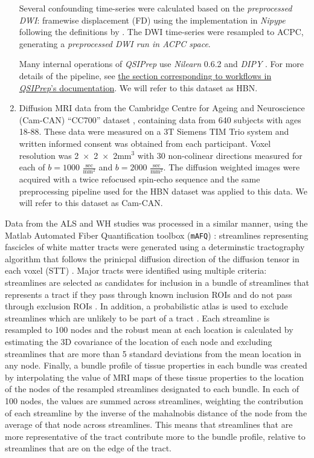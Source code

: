 \documentclass[10pt,%
               aps,%
               prl,%
               reprint,%
               superscriptaddress,%
               preprintnumbers,%
               linenumbers,%
               amsmath,%
               floatfix]{revtex4-2}
\begin{document}
\begin{enumerate}
Several confounding time-series were calculated based on the
\emph{preprocessed DWI}: framewise displacement (FD) using the implementation
in \emph{Nipype} following the definitions by \cite{power_fd_dvars}. The DWI
time-series were resampled to ACPC, generating a \emph{preprocessed DWI run
in ACPC space}.

Many internal operations of \emph{QSIPrep} use \emph{Nilearn} 0.6.2
\cite[RRID:SCR\_001362]{nilearn} and \emph{DIPY} \cite{dipy}. For more
details of the pipeline, see
\href{https://qsiprep.readthedocs.io/en/latest/workflows.html}{the
section corresponding to workflows in \emph{QSIPrep}'s documentation}.
We will refer to this dataset as HBN.

\item Diffusion MRI data from the Cambridge Centre for Ageing and
Neuroscience (Cam-CAN) ``CC700'' dataset
\cite{shafto2014cambridge,taylor2017cambridge}, containing data from 640
subjects with ages 18-88. These data were measured on a 3T Siemens TIM Trio
system and written informed consent was obtained from each participant. Voxel
resolution was \num{2x2x2}$\text{mm}^3$ with 30 non-colinear directions
measured for each of $b=1000$ $\frac{\text{sec}}{\text{mm}^2}$ and $b=2000$
$\frac{\text{sec}}{\text{mm}^2}$. The diffusion weighted images were acquired
with a twice refocused spin-echo sequence and the same preprocessing pipeline
used for the HBN dataset was applied to this data. We will refer to this
dataset as Cam-CAN.

\end{enumerate}

Data from the ALS and WH studies was processed in a similar manner,
using the Matlab Automated Fiber Quantification toolbox (\texttt{mAFQ})
\cite{yeatman2012tract}: streamlines representing fascicles of white
matter tracts were generated using a determinstic tractography algorithm
that follows the prinicpal diffusion direction of the diffusion tensor
in each voxel (STT) \cite{basser2000vivo}. Major tracts were identified
using multiple criteria: streamlines are selected as candidates for
inclusion in a bundle of streamlines that represents a tract if they
pass through known inclusion ROIs and do not pass through exclusion
ROIs \cite{wakana2007reproducibility}. In addition, a probabilistic
atlas is used to exclude streamlines which are unlikely to be part of
a tract \cite{Hua2008-sh}. Each streamline is resampled to 100 nodes
and the robust mean at each location is calculated by estimating the 3D
covariance of the location of each node and excluding streamlines that
are more than 5 standard deviations from the mean location in any node.
Finally, a bundle profile of tissue properties in each bundle was created
by interpolating the value of MRI maps of these tissue properties to the
location of the nodes of the resampled streamlines designated to each
bundle. In each of 100 nodes, the values are summed across streamlines,
weighting the contribution of each streamline by the inverse of the
mahalnobis distance of the node from the average of that node across
streamlines. This means that streamlines that are more representative of
the tract contribute more to the bundle profile, relative to streamlines
that are on the edge of the tract.
\end{document}
